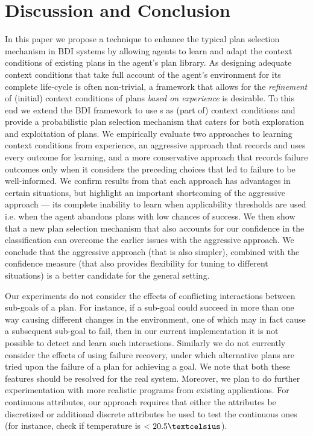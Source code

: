 \section{Discussion and Conclusion}\label{sec:discussion}

In this paper we propose a technique to enhance the typical plan selection mechanism in BDI systems by allowing agents to learn and adapt the context conditions of existing plans in the agent's plan library.
%
As designing adequate context conditions that take full account of the agent's environment for its complete life-cycle is often non-trivial, a framework that allows for the \emph{refinement} of (initial) context conditions of plans \textit{based on experience} is desirable. To this end we extend the BDI framework to use {\dt}s as (part of) context conditions and provide a probabilistic plan selection mechanism that caters for both exploration and exploitation of plans.
%
We empirically evaluate two approaches to learning context conditions from experience, an aggressive approach that records and uses every outcome for learning, and a more conservative approach that records failure outcomes only when it considers the preceding choices that led to failure to be well-informed.
We confirm results from \cite{APSS08} that each approach has advantages in certain situations, but highlight an important shortcoming of the aggressive approach --- its complete inability to learn when applicability thresholds are used i.e. when the agent abandons plans with low chances of success. We then show that a new plan selection mechanism that also accounts for our confidence in the \dt classification can overcome the earlier issues with the aggressive approach. We conclude that the aggressive approach (that is also simpler), combined with the confidence measure (that also provides flexibility for tuning to different situations) is a better candidate for the general setting.

Our experiments do not consider the effects of conflicting interactions between sub-goals of a plan. For instance, if a sub-goal could succeed in more than one way causing different changes in the environment, one of which may in fact cause a subsequent sub-goal to fail, then in our current implementation it is not possible to detect and learn such interactions. Similarly we do not currently consider the effects of using failure recovery, under which alternative plans are tried upon the failure of a plan for achieving a goal. We note that both these features should be resolved for the real system. Moreover, we plan to do further experimentation with more realistic programs from existing applications. For continuous attributes, our approach requires that either the attributes be discretized or additional discrete attributes be used to test the continuous ones (for instance, check if temperature is $<20.5\textcelsius$).

